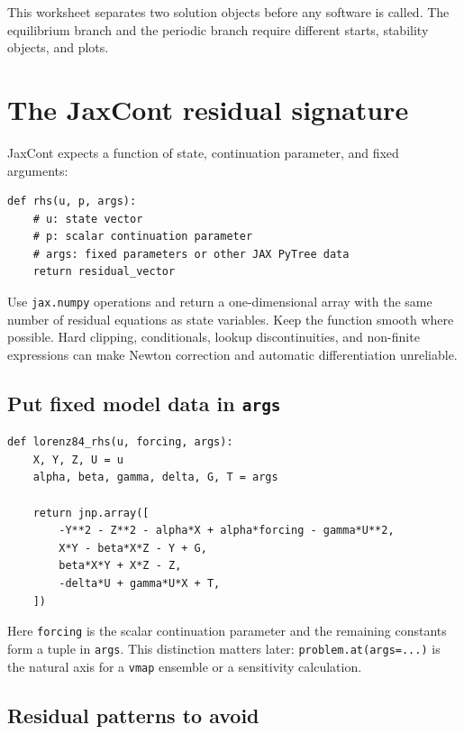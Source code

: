 \documentclass[11pt,oneside]{book}
\begin{document}
This worksheet separates two solution objects before any software is called.
The equilibrium branch and the periodic branch require different starts,
stability objects, and plots.

\section{The JaxCont residual signature}

JaxCont expects a function of state, continuation parameter, and fixed
arguments:

\begin{lstlisting}
def rhs(u, p, args):
    # u: state vector
    # p: scalar continuation parameter
    # args: fixed parameters or other JAX PyTree data
    return residual_vector
\end{lstlisting}

Use \texttt{jax.numpy} operations and return a one-dimensional array with the
same number of residual equations as state variables. Keep the function smooth
where possible. Hard clipping, conditionals, lookup discontinuities, and
non-finite expressions can make Newton correction and automatic
differentiation unreliable.

\subsection{Put fixed model data in \texttt{args}}

\begin{lstlisting}
def lorenz84_rhs(u, forcing, args):
    X, Y, Z, U = u
    alpha, beta, gamma, delta, G, T = args

    return jnp.array([
        -Y**2 - Z**2 - alpha*X + alpha*forcing - gamma*U**2,
        X*Y - beta*X*Z - Y + G,
        beta*X*Y + X*Z - Z,
        -delta*U + gamma*U*X + T,
    ])
\end{lstlisting}

Here \texttt{forcing} is the scalar continuation parameter and the remaining
constants form a tuple in \texttt{args}. This distinction matters later:
\texttt{problem.at(args=...)} is the natural axis for a \texttt{vmap} ensemble
or a sensitivity calculation.

\subsection{Residual patterns to avoid}
\end{document}
